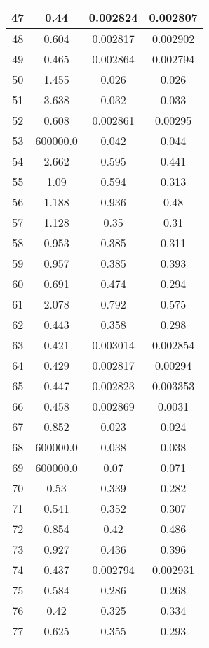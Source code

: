 \begin{table}[H]
\begin{minipage}{5.02cm}
{\begin{tabular}{|c|c|c|c|}
47 & 0.44 & 0.002824 & 0.002807 \\
\hline
48 & 0.604 & 0.002817 & 0.002902 \\
\hline
49 & 0.465 & 0.002864 & 0.002794 \\
\hline
50 & 1.455 & 0.026 & 0.026 \\
\hline
51 & 3.638 & 0.032 & 0.033 \\
\hline
52 & 0.608 & 0.002861 & 0.00295 \\
\hline
53 & 600000.0 & 0.042 & 0.044 \\
\hline
54 & 2.662 & 0.595 & 0.441 \\
\hline
55 & 1.09 & 0.594 & 0.313 \\
\hline
56 & 1.188 & 0.936 & 0.48 \\
\hline
57 & 1.128 & 0.35 & 0.31 \\
\hline
58 & 0.953 & 0.385 & 0.311 \\
\hline
59 & 0.957 & 0.385 & 0.393 \\
\hline
60 & 0.691 & 0.474 & 0.294 \\
\hline
61 & 2.078 & 0.792 & 0.575 \\
\hline
62 & 0.443 & 0.358 & 0.298 \\
\hline
63 & 0.421 & 0.003014 & 0.002854 \\
\hline
64 & 0.429 & 0.002817 & 0.00294 \\
\hline
65 & 0.447 & 0.002823 & 0.003353 \\
\hline
66 & 0.458 & 0.002869 & 0.0031 \\
\hline
67 & 0.852 & 0.023 & 0.024 \\
\hline
68 & 600000.0 & 0.038 & 0.038 \\
\hline
69 & 600000.0 & 0.07 & 0.071 \\
\hline
70 & 0.53 & 0.339 & 0.282 \\
\hline
71 & 0.541 & 0.352 & 0.307 \\
\hline
72 & 0.854 & 0.42 & 0.486 \\
\hline
73 & 0.927 & 0.436 & 0.396 \\
\hline
74 & 0.437 & 0.002794 & 0.002931 \\
\hline
75 & 0.584 & 0.286 & 0.268 \\
\hline
76 & 0.42 & 0.325 & 0.334 \\
\hline
77 & 0.625 & 0.355 & 0.293 \\
\hline
\end{tabular}
        }
    \end{minipage}
    \begin{minipage}{5.05cm}

\end{minipage}
\end{table}
